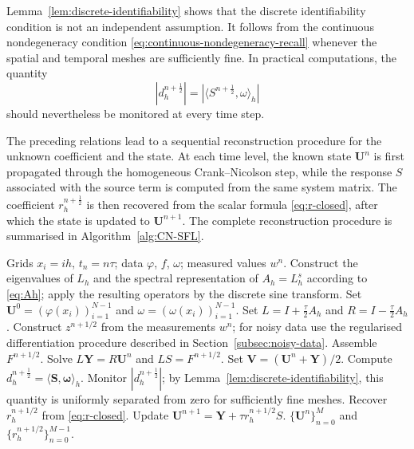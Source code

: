 \documentclass[reqno]{amsart}
\newcommand{\Ah}{A_h}
\begin{document}
\begin{remark}
Lemma~\ref{lem:discrete-identifiability} shows that the discrete
identifiability condition is not an independent assumption.
It follows from the continuous nondegeneracy condition
\eqref{eq:continuous-nondegeneracy-recall} whenever the spatial and
temporal meshes are sufficiently fine. In practical computations,
the quantity
\[
|d_h^{n+\frac12}|
=
|\langle S^{n+\frac12},\omega\rangle_h|
\]
should nevertheless be monitored at every time step.
\end{remark}


 The preceding relations lead to a sequential reconstruction procedure
for the unknown coefficient and the state. At each time level, the
known state $\mathbf U^n$ is first propagated through the homogeneous
Crank--Nicolson step, while the response $ S$ associated with
the source term is computed from the same system matrix. The
coefficient $r_h^{n+\frac12}$ is then recovered from the scalar
formula \eqref{eq:r-closed}, after which the state is updated to
$\mathbf U^{n+1}$. The complete reconstruction procedure is summarised
in Algorithm~\ref{alg:CN-SFL}.

\begin{algorithm}[H]
\caption{CN--SFL algorithm for simultaneous recovery of $r(t)$ and $u(t,x)$}
\label{alg:CN-SFL}
\begin{algorithmic}[1]
\Require Grids $x_i=ih$, $t_n=n\tau$; data $\varphi$, $f$, $\omega$; measured values $w^n$.
\State Construct the eigenvalues of $L_h$ and the spectral
representation of $A_h=L_h^s$ according to \eqref{eq:Ah};
apply the resulting operators by the discrete sine transform.
\State Set $\mathbf U^0=(\varphi(x_i))_{i=1}^{N-1}$ and $ \omega=(\omega(x_i))_{i=1}^{N-1}$.
\State Set $L=I+\frac\tau2\Ah$ and $R=I-\frac\tau2\Ah$.
\State Construct $z^{n+1/2}$ from the measurements $w^n$; for noisy data use the regularised differentiation procedure described in Section~\ref{subsec:noisy-data}.
 \State Assemble $  F^{n+1/2}$.
 \State Solve $L\mathbf Y=R\mathbf U^n$ and $L  S=  F^{n+1/2}$.
 \State Set $\mathbf V=(\mathbf U^n+\mathbf Y)/2$.
 \State Compute $d_h^{n+\frac12}
=\langle\mathbf S,\boldsymbol\omega\rangle_h$.
\State Monitor $|d_h^{n+\frac12}|$; by
Lemma~\ref{lem:discrete-identifiability}, this quantity is uniformly
separated from zero for sufficiently fine meshes.
 \State Recover $r_h^{n+1/2}$ from \eqref{eq:r-closed}.
 \State Update $\mathbf U^{n+1}=\mathbf Y+\tau r_h^{n+1/2}  S$.
\EndFor
\State \Return $\{\mathbf U^n\}_{n=0}^M$ and $\{r_h^{n+1/2}\}_{n=0}^{M-1}$.
\end{algorithmic}
\end{algorithm}
\end{document}
